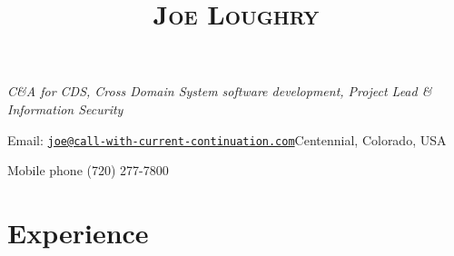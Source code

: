\documentclass[12pt,letterpaper]{article}
\date{}
\title{\textsc{Joe Loughry}}
\author{}
\begin{document}
\maketitle
\thispagestyle{empty}

\vspace{-32mm}
{\emph{C\&A for CDS, Cross Domain System software development, Project Lead \& Information Security}}


\vspace{4mm}
Email: \href{mailto:joe@call-with-current-continuation.com}{\nolinkurl{joe@call-with-current-continuation.com}}\hfill Centennial, Colorado, USA

\hfill Mobile phone (720) 277-7800 %

\vspace{-8mm}
\section*{Experience}
\end{document}
